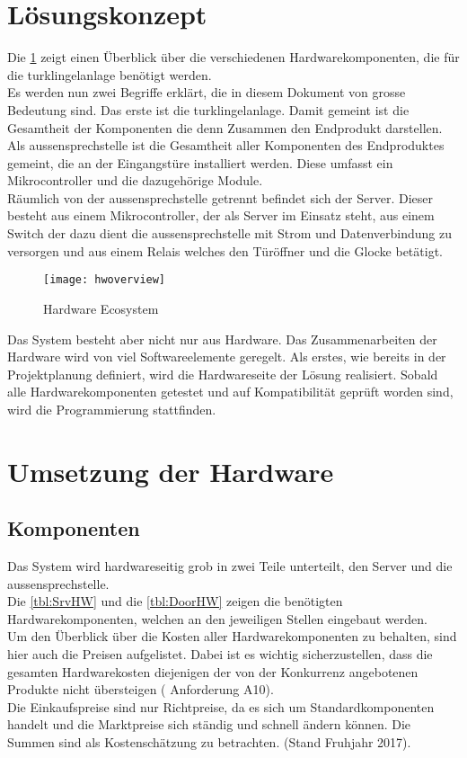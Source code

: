 \section{Lösungskonzept}
\label{sec:lösungskonzept}
Die \cref{fig:hwoverview} zeigt einen Überblick über die verschiedenen Hardwarekomponenten, die für die \gls{turklingelanlage} benötigt werden.
\\
Es werden nun zwei Begriffe erklärt, die in diesem Dokument von grosse Bedeutung sind. Das erste ist die \gls{turklingelanlage}. Damit gemeint ist die Gesamtheit der Komponenten die denn Zusammen den Endprodukt darstellen.
\\
Als \gls{aussensprechstelle} ist die Gesamtheit aller Komponenten des Endproduktes gemeint, die an der Eingangstüre installiert werden. Diese umfasst ein Mikrocontroller und die dazugehörige Module.
\\
Räumlich von der \gls{aussensprechstelle} getrennt befindet sich der Server. Dieser besteht aus einem Mikrocontroller, der als Server im Einsatz steht, aus einem Switch der dazu dient die \gls{aussensprechstelle} mit Strom und Datenverbindung zu versorgen und aus einem Relais welches den Türöffner und die Glocke betätigt.
\begin{figure}[htb!]
	\begin{center}
		\texttt{[image: hwoverview]}
		\caption[Hardware Ecosystem]{Hardware Ecosystem}
		\label{fig:hwoverview}
	\end{center}
\end{figure}
Das System besteht aber nicht nur aus Hardware. Das Zusammenarbeiten der Hardware wird von viel Softwareelemente geregelt. Als erstes, wie bereits in der Projektplanung definiert, wird die Hardwareseite der Lösung realisiert. Sobald alle Hardwarekomponenten getestet und auf Kompatibilität geprüft worden sind, wird die Programmierung stattfinden.
\newpage

\section{Umsetzung der Hardware}
\label{sec:chapterexample}
\subsection{Komponenten}
Das System wird hardwareseitig grob in zwei Teile unterteilt, den Server und die \gls{aussensprechstelle}.
\\
Die \cref{tbl:SrvHW} und die \cref{tbl:DoorHW} zeigen die benötigten Hardwarekomponenten, welchen an den jeweiligen Stellen eingebaut werden.
\\
Um den Überblick über die Kosten aller Hardwarekomponenten zu behalten, sind hier auch die Preisen aufgelistet. Dabei ist es wichtig sicherzustellen, dass die gesamten Hardwarekosten diejenigen der von der Konkurrenz angebotenen Produkte nicht übersteigen ( Anforderung A10).
\\
Die Einkaufspreise sind nur Richtpreise, da es sich um Standardkomponenten handelt und die Marktpreise sich ständig und schnell ändern können. Die Summen sind als Kostenschätzung zu betrachten. (Stand Fruhjahr 2017).

